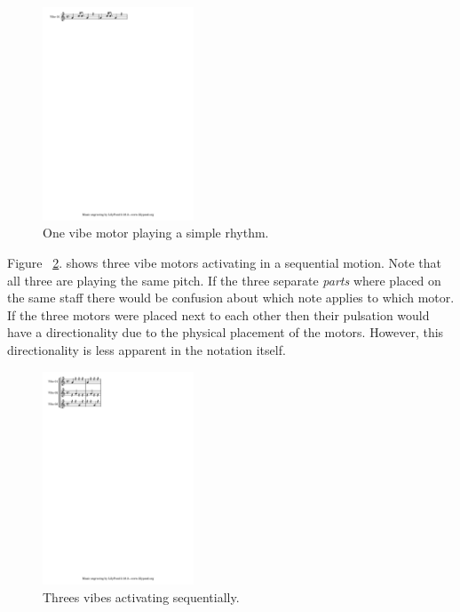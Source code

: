 \documentclass[a4paper, twocolumn]{article}
\begin{document}
\begin{figure}[htb]
    \begin{center}
        \includegraphics[width=0.4\textwidth]{graphics/arrowsMoving-00.pdf}
    \end{center}
    \caption{One vibe motor playing a simple rhythm.\label{fig:arrowsMoving00}}
\end{figure}

Figure ~\ref{fig:arrowsMoving01}. shows three vibe motors activating in a sequential motion. Note that all three are playing the same pitch. If the three separate \textit{parts} where placed on the same staff there would be confusion about which note applies to which motor. If the three motors were placed next to each other then their pulsation would have a directionality due to the physical placement of the motors. However, this directionality is less apparent in the notation itself. 
\\

\begin{figure}[htb]
    \begin{center}
        \includegraphics[width=0.4\textwidth]{graphics/arrowsMoving-01.pdf}
    \end{center}
    \caption{Threes vibes activating sequentially.\label{fig:arrowsMoving01}}
\end{figure}
\end{document}
